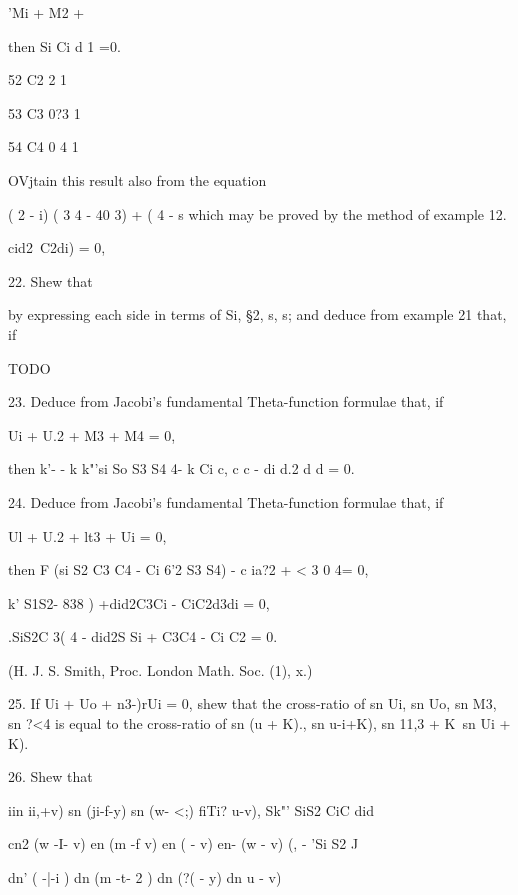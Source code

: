 'Mi + M2 + %

then Si Ci d 1 =0.

52 C2 2 1

53 C3 0?3 1

54 C4 0 4 1

OVjtain this result also from the equation

( 2 - i) ( 3 4 - 40 3) + ( 4 - s which may be proved by the method of
example 12.

 cid2~C2di) = 0,


%
%

22. Shew that

by expressing each side in terms of Si, §2, s, s; and deduce from
example 21 that, if

TODO


23. Deduce from Jacobi's fundamental Theta-function formulae that, if

Ui + U.2 + M3 + M4 = 0,

then k'- - k k"'si So S3 S4 4- k Ci c, c c - di d.2 d d = 0.


24. Deduce from Jacobi's fundamental Theta-function formulae that, if

Ul + U.2 + lt3 + Ui = 0,

then F (si S2 C3 C4 - Ci 6'2 S3 S4) - c ia?2 + < 3 0 4= 0,

k' S1S2- 838 ) +did2C3Ci - CiC2d3di = 0,

.SiS2C 3( 4 - did2S Si + C3C4 - Ci C2 = 0.

(H. J. S. Smith, Proc. London Math. Soc. (1), x.)

25. If Ui + Uo + n3-)rUi = 0, shew that the cross-ratio of sn Ui, sn
Uo, sn M3, sn ?<4 is equal to the cross-ratio of sn (u + K)., sn
u-i+K), sn 11,3 + K\ sn Ui + K).


26. Shew that

iin ii,+v) sn (ji-f-y) sn (w- <;) fiTi? u-v), Sk"' SiS2 CiC did

cn2 (w -I- v) en (m -f v) en ( - v) en- (w - v) (, - 'Si S2 J

dn' ( -|-i ) dn (m -t- 2 ) dn (?( - y) dn u - v)


